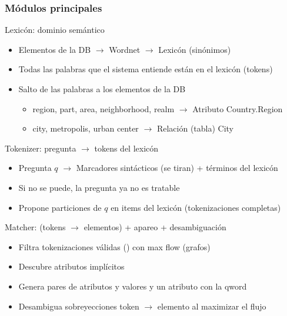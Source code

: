 \begin{frame}[<+->]\fontsize{7.5pt}{7.2}\selectfont
  \frametitle{Módulos principales}
  \begin{block}{Lexicón: dominio semántico}
    \begin{itemize}
      \item Elementos de la DB $\rightarrow$ Wordnet $\rightarrow$ Lexicón (sinónimos)
      \item Todas las palabras que el sistema entiende están en el lexicón (tokens)
      \item Salto de las palabras a los elementos de la DB
      \begin{itemize}
        \item  \tiny{region, part, area, neighborhood, realm  $\rightarrow$ Atributo Country.Region  }
        \item  \tiny{city, metropolis, urban center  $\rightarrow$ Relación (tabla) City}
      \end{itemize}
    \end{itemize}
  \end{block}
  \begin{alertblock}{Tokenizer: pregunta $\rightarrow$ tokens del lexicón}
      \begin{itemize}
          \item Pregunta $q$ $\rightarrow$ Marcadores sintácticos (se tiran) + términos del lexicón
          \item Si no se puede, la pregunta ya no es tratable
          \item Propone particiones de $q$ en items del lexicón (tokenizaciones completas)
      \end{itemize}
  \end{alertblock}
  \begin{exampleblock}{Matcher: (tokens $\rightarrow$ elementos) + apareo + desambiguación}
      \begin{itemize}
          \item Filtra tokenizaciones válidas () con max flow (grafos)
          \item Descubre atributos implícitos
          \item Genera pares de atributos y valores y un atributo con la qword
          \item Desambigua sobreyecciones token $\rightarrow$ elemento al maximizar el flujo
    \end{itemize} 
  \end{exampleblock}
\end{frame}



